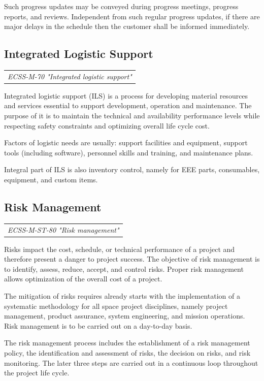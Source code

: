 Such progress updates may be conveyed during progress meetings, progress reports, and reviews. Independent from such regular progress updates, if there are major delays in the schedule then the customer shall be informed immediately.

\subsection{Integrated Logistic Support}

\begin{tabular}{l}
\textit{ECSS-M-70 "Integrated logistic support" \cite{ECSS-M-70}}
\end{tabular}

Integrated logistic support (ILS) is a process for developing material resources and services essential to support development, operation and maintenance. The purpose of it is to maintain the technical and availability performance levels while respecting safety constraints and optimizing overall life cycle cost.

Factors of logistic needs are usually: support facilities and equipment, support tools (including software), personnel skills and training, and maintenance plans.  

Integral part of ILS is also inventory control, namely for EEE parts, consumables, equipment, and custom items.

\subsection{Risk Management}
\label{sec:Risk Management}

\begin{tabular}{l}
\textit{ECSS-M-ST-80 "Risk management" \cite{ECSS-M-ST-80}}
\end{tabular}

Risks impact the cost, schedule, or technical performance of a project and therefore present a danger to project success. The objective of risk management is to identify, assess, reduce, accept, and control risks. Proper risk management allows optimization of the overall cost of a project.

The mitigation of risks requires already starts with the implementation of a systematic methodology for all space project disciplines, namely project management, product assurance, system engineering, and mission operations. Risk management is to be carried out on a day-to-day basis.

The risk management process includes the establishment of a risk management policy, the identification and assessment of risks, the decision on risks, and risk monitoring. The later three steps are carried out in a continuous loop throughout the project life cycle.

